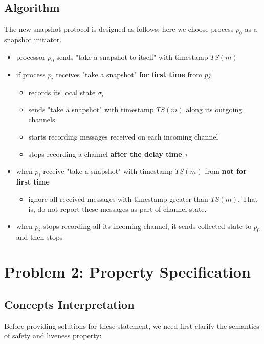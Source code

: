\documentclass[11pt,a4paper]{article}
\begin{document}
\subsection{Algorithm}
The new snapshot protocol is designed as follows:
here we choose process $p_0$ as a snapshot initiator.
\begin{itemize}
    \item{processor $p_0$ sends "take a snapshot to itself" with timestamp
            $TS(m)$}
    \item{if process $p_i$ receives "take a snapshot" \textbf{for first time} from $pj$ }
        \begin{itemize}
            \item{records its local state $\sigma_i$}
            \item{sends "take a snapshot" with timestamp $TS(m)$ along its outgoing channels}
            \item{starts recording messages received on each incoming channel}
            \item{stops recording a channel \textbf{after the delay time
                        $\tau$}}
        \end{itemize}
    \item{when $p_i$ receive "take a snapshot" with timestamp $TS(m)$ from
            \textbf{not for first time}}
        \begin{itemize}
            \item{ignore all received messages with timestamp greater than
                    $TS(m)$. That is, do not report these messages as part of
                    channel state.}
        \end{itemize}
    \item{when $p_i$ stops recording all its incoming channel, it sends
            collected state to $p_0$ and then stops}
\end{itemize}



\newpage
\section{Problem 2: Property Specification}
\subsection{Concepts Interpretation}
Before providing solutions for these statement, we need first clarify the
semantics of safety and liveness property:
\end{document}
